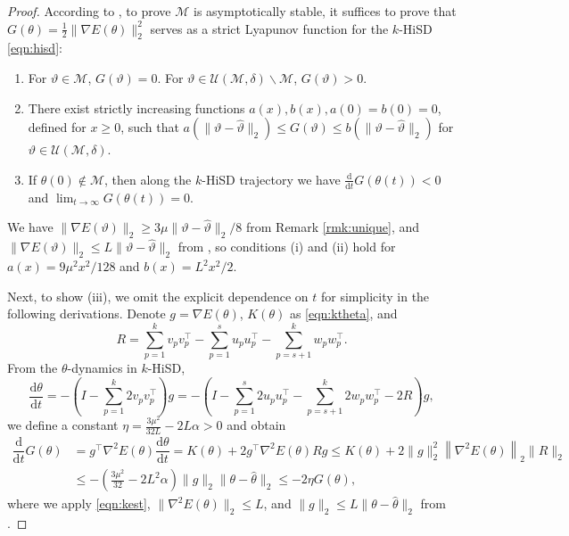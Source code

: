 \documentclass[final]{siamart251216}
\begin{document}
\begin{proof}
According to \cite[Theorem 4.18]{bhatia2002}, to prove $\mathcal{M}$ is asymptotically stable, it suffices to prove that $G(\theta)=\frac{1}{2}\|\nabla E(\theta)\|_2^2$ serves as a strict Lyapunov function for the $k$-HiSD \eqref{eqn:hisd}:
\begin{enumerate}
\item [(i)] For $\vartheta\in \mathcal{M}$, $G(\vartheta) = 0$. 
 For $\vartheta \in \mathcal{U}(\mathcal{M},\delta) \backslash \mathcal{M}$, $G(\vartheta) > 0$. 
\item [(ii)] There exist strictly increasing functions $a(x), b(x), a(0)= b(0)=0$, defined for $x \geqslant 0$, such that
$a(\|\vartheta-\hat\vartheta\|_2) \leqslant G(\vartheta) \leqslant b(\|\vartheta-\hat\vartheta\|_2)$ for $\vartheta \in \mathcal{U}(\mathcal{M},\delta)$.
\item [(iii)] If $\theta(0) \notin \mathcal{M}$, then along the $k$-HiSD trajectory we have $\frac{\mathrm{d}}{\mathrm{d}t}G(\theta(t)) <0$ and $\lim_{t\to \infty} G(\theta(t)) =0$.
\end{enumerate} 
We have $\|\nabla E(\vartheta)\|_2\geqslant 3\mu\|\vartheta-\hat\vartheta\|_2/8$ from Remark \ref{rmk:unique}, and $\|\nabla E(\vartheta)\|_2 \leqslant L\|\vartheta-\hat\vartheta\|_2$ from , so conditions (i) and (ii) hold for $a(x)=9\mu^2x^2/128$ and $b(x)=L^2x^2/2$.

Next, to show (iii), we omit the explicit dependence on $t$ for simplicity in the following derivations.
Denote $g = \nabla E(\theta)$, $K(\theta)$ as \eqref{eqn:ktheta}, and 
\begin{equation}
R=\sum_{p=1}^k v_pv_p^\top  
- \sum_{p=1}^s u_pu_p^\top
- \sum_{p=s+1}^k w_pw_p^\top.    
\end{equation}
From the $\theta$-dynamics in $k$-HiSD,
\begin{equation}
\dfrac{\mathrm{d}\theta}{\mathrm{d}t} 
=-\left(I-\sum_{p=1}^k 2v_p v_p^\top\right)g
=-\left(I-\sum_{p=1}^s 2u_p u_p^\top- \sum_{p=s+1}^k 2w_p w_p^\top-2 R\right)g,
\end{equation}
we define a constant $\eta=\frac{3\mu^2}{32L}-2L\alpha>0$ and obtain
\begin{equation*}
\label{eqn:lyp}
\begin{aligned}
\dfrac{\mathrm{d}}{\mathrm{d}t}G(\theta)&=
g^{\top}\nabla^{2}E(\theta)\dfrac{\mathrm{d}\theta}{\mathrm{d}t}=K(\theta)+2g^{\top}\nabla^{2}E(\theta)Rg
\leqslant 
K(\theta)+2\|g\|_2^2
\left\|\nabla^{2}E(\theta)\right\|_2 \|R\|_2
\\&
\leqslant 
-\left(\frac{3\mu^2}{32}-2L^2\alpha\right)\|g\|_2\|\theta-\hat\theta\|_2
\leqslant
-2\eta G(\theta),
\end{aligned}
\end{equation*}
where we apply \eqref{eqn:kest}, 
$\|\nabla^{2}E(\theta)\|_2\leqslant L$,
and $\|g\|_2\leqslant L\|\theta-\hat\theta\|_2$ from .


\end{proof}
\end{document}
